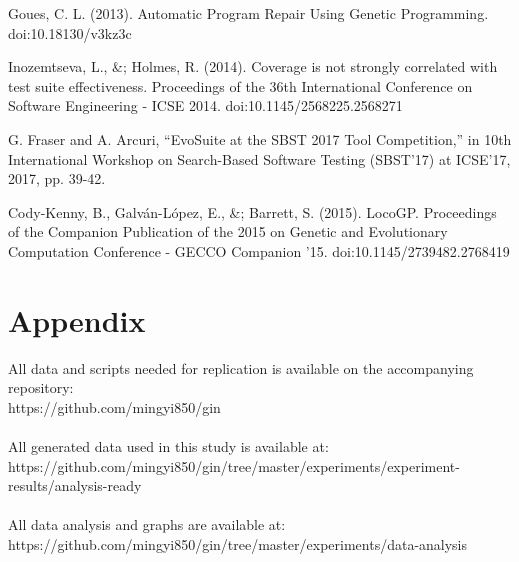\documentclass[titlepage]{article}
\begin{document}
\begin{thebibliography}{99}
Goues, C. L. (2013). Automatic Program Repair Using Genetic Programming. doi:10.18130/v3kz3c

Inozemtseva, L., \&; Holmes, R. (2014). Coverage is not strongly correlated with test suite effectiveness. Proceedings of the 36th International Conference on Software Engineering - ICSE 2014. doi:10.1145/2568225.2568271

G. Fraser and A. Arcuri, “EvoSuite at the SBST 2017 Tool Competition,” in 10th International Workshop on Search-Based Software Testing (SBST’17) at ICSE’17, 2017, pp. 39-42.

Cody-Kenny, B., Galván-López, E., \&; Barrett, S. (2015). LocoGP. Proceedings of the Companion Publication of the 2015 on Genetic and Evolutionary Computation Conference - GECCO Companion '15. doi:10.1145/2739482.2768419

\end{thebibliography}
\section{Appendix}

All data and scripts needed for replication is available on the accompanying repository: \\
https://github.com/mingyi850/gin \\\\
All generated data used in this study is available at: \\
https://github.com/mingyi850/gin/tree/master/experiments/experiment-results/analysis-ready \\\\
All data analysis and graphs are available at: \\
https://github.com/mingyi850/gin/tree/master/experiments/data-analysis
\end{document}
